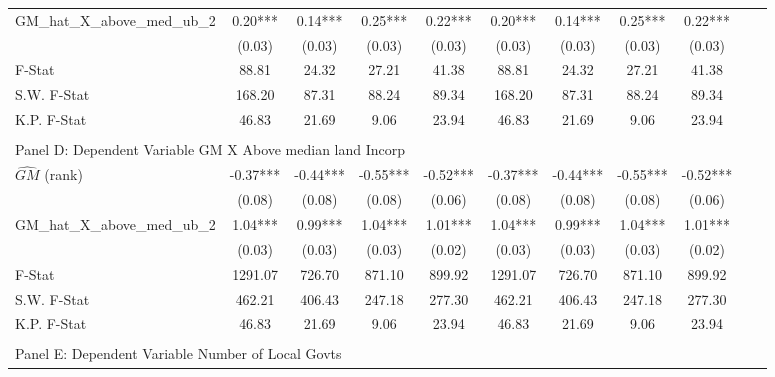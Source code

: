 \begin{table}[htbp]
\begin{threeparttable}
\begin{tabular}{l*{10}{c}}
\addlinespace
GM\_hat\_X\_above\_med\_ub\_2&       0.20***&       0.14***&       0.25***&       0.22***&       0.20***&       0.14***&       0.25***&       0.22***\\
                &     (0.03)   &     (0.03)   &     (0.03)   &     (0.03)   &     (0.03)   &     (0.03)   &     (0.03)   &     (0.03)   \\
\midrule
F-Stat          &      88.81   &      24.32   &      27.21   &      41.38   &      88.81   &      24.32   &      27.21   &      41.38   \\
S.W. F-Stat     &     168.20   &      87.31   &      88.24   &      89.34   &     168.20   &      87.31   &      88.24   &      89.34   \\
K.P. F-Stat     &      46.83   &      21.69   &       9.06   &      23.94   &      46.83   &      21.69   &       9.06   &      23.94   \\
\cmidrule[\heavyrulewidth](lr){1-9} \\ \cmidrule[\heavyrulewidth](lr){1-9}
\multicolumn{8}{l}{Panel D: Dependent Variable GM X Above median land Incorp}\\
\cmidrule(lr){1-9}
$\hat{GM}$ (rank)&      -0.37***&      -0.44***&      -0.55***&      -0.52***&      -0.37***&      -0.44***&      -0.55***&      -0.52***\\
                &     (0.08)   &     (0.08)   &     (0.08)   &     (0.06)   &     (0.08)   &     (0.08)   &     (0.08)   &     (0.06)   \\
\addlinespace
GM\_hat\_X\_above\_med\_ub\_2&       1.04***&       0.99***&       1.04***&       1.01***&       1.04***&       0.99***&       1.04***&       1.01***\\
                &     (0.03)   &     (0.03)   &     (0.03)   &     (0.02)   &     (0.03)   &     (0.03)   &     (0.03)   &     (0.02)   \\
\midrule
F-Stat          &    1291.07   &     726.70   &     871.10   &     899.92   &    1291.07   &     726.70   &     871.10   &     899.92   \\
S.W. F-Stat     &     462.21   &     406.43   &     247.18   &     277.30   &     462.21   &     406.43   &     247.18   &     277.30   \\
K.P. F-Stat     &      46.83   &      21.69   &       9.06   &      23.94   &      46.83   &      21.69   &       9.06   &      23.94   \\
\cmidrule[\heavyrulewidth](lr){1-9} \\ \cmidrule[\heavyrulewidth](lr){1-9}
\multicolumn{8}{l}{Panel E: Dependent Variable Number of Local Govts}\\

\end{tabular}
\end{threeparttable}
\end{table}
